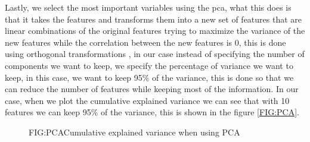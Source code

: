 Lastly, we select the most important variables using the \ac{pca}, what this does is that it takes the features and transforms them into a new set of features that are linear combinations of the original features trying to maximize the variance of the new features while the correlation between the new features is 0, this is done using orthogonal transformations \cite{daffertshofer_pca_2004}, in our case instead of specifying the number of components we want to keep, we specify the percentage of variance we want to keep, in this case, we want to keep 95\% of the variance, this is done so that we can reduce the number of features while keeping most of the information. In our case, when we plot the cumulative explained variance we can see that with 10 features we can keep 95\% of the variance, this is shown in the figure \ref{FIG:PCA}.

\begin{figure}[PCA]{FIG:PCA}{Cumulative explained variance when using PCA}
\end{figure}
